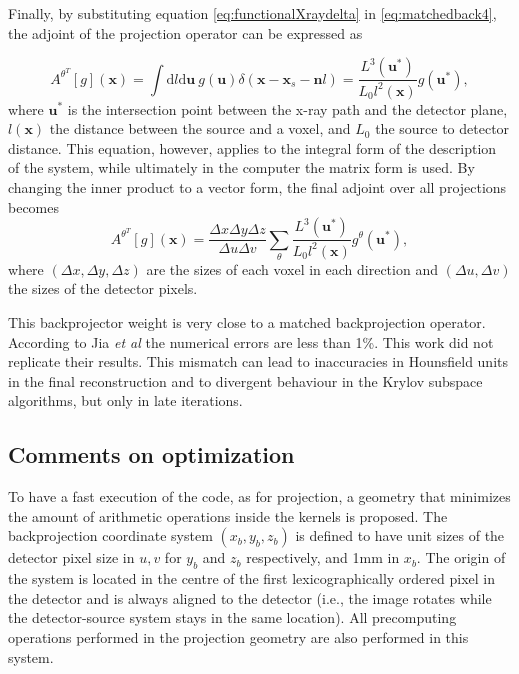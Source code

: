 Finally, by substituting equation \ref{eq:functionalXraydelta} in \ref{eq:matchedback4}, the adjoint of the projection operator can be expressed as

\begin{equation}
A^{\theta^T}[g](\textbf{x})=\int\mathrm{d}l\mathrm{d}\textbf{u} \ g(\textbf{u})\delta(\textbf{x}-\textbf{x}_s-\textbf{n}l)=\frac{L^3(\textbf{u}^*)}{L_0l^2(\textbf{x})}g(\textbf{u}^*),
\end{equation}
where $\textbf{u}^*$ is the intersection point between the x-ray path and the detector plane, $l(\textbf{x})$ the distance between the source and a voxel, and $L_0$ the source to detector distance. This equation, however, applies to the integral form of the description of the system, while ultimately in the computer the matrix form is used. By changing the inner product to a vector form, the final adjoint over all projections becomes
\begin{equation}
A^{\theta^T}[g](\textbf{x})=\frac{\Delta x \Delta y \Delta z}{\Delta u \Delta v}\sum_\theta\frac{L^3(\textbf{u}^*)}{L_0l^2(\textbf{x})}g^\theta(\textbf{u}^*),\label{eq:finalmatched}
\end{equation}
where $(\Delta x,\Delta y,\Delta z)$ are the sizes of each voxel in each direction and $(\Delta u,\Delta v)$ the sizes of the detector pixels. 

This backprojector weight is very close to a matched backprojection operator. According to Jia \textit{et al} the numerical errors are less than 1\%. This work did not replicate their results. This mismatch can lead to inaccuracies in Hounsfield units in the final reconstruction and to divergent behaviour in the Krylov subspace algorithms, but only in late iterations.

\subsection{Comments on optimization}

To have a fast execution of the code, as for projection, a geometry that minimizes the amount of arithmetic operations inside the kernels is proposed. The backprojection coordinate system $(x_b,y_b,z_b)$ is defined to have unit sizes of the detector pixel size in $u,v$ for $y_b$ and $z_b$ respectively, and 1mm in $x_b$. The origin of the system is located in the centre of the first lexicographically ordered pixel in the detector and is always aligned to the detector (i.e., the image rotates while the detector-source system stays in the same location).  All precomputing operations performed in the projection geometry are also performed in this system.

